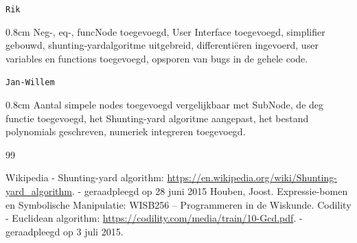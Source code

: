 \documentclass[a4paper]{article}
\newcommand{\com}[2]{\texttt{#1}\mbox{}\vspace{-2ex}\begin{adjustwidth}{0.8cm}{} #2 \end{adjustwidth}}
\begin{document}
\com{Rik} {Neg-, eq-, funcNode toegevoegd, User Interface toegevoegd, simplifier gebouwd, shunting-yardalgoritme uitgebreid, differenti\"eren ingevoerd, user variables en functions toegevoegd, opsporen van bugs in de gehele code.}

\com{Jan-Willem} {Aantal simpele nodes toegevoegd vergelijkbaar met SubNode, de deg functie toegevoegd, het Shunting-yard algoritme aangepast, het bestand polynomials geschreven, numeriek integreren toegevoegd.}

\begin{thebibliography}{99}

 Wikipedia - Shunting-yard algorithm:
\url{https://en.wikipedia.org/wiki/Shunting-yard_algorithm}. 
 - geraadpleegd op 28 juni 2015
  Houben, Joost. Expressie-bomen en Symbolische Manipulatie: WISB256 – Programmeren in de Wiskunde.
  Codility - Euclidean algorithm: \url{https://codility.com/media/train/10-Gcd.pdf}. - geraadpleegd op 3 juli 2015. 


\end{thebibliography}
\end{document}
